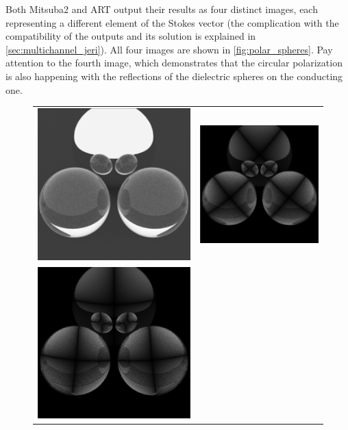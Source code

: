 Both Mitsuba2 and ART output their results as four distinct images, each representing a different element of the Stokes vector (the complication with the compatibility of the outputs and its solution is explained in \autoref{sec:multichannel_jeri}). All four images are shown in \autoref{fig:polar_spheres}. Pay attention to the fourth image, which demonstrates that the circular polarization is also happening with the reflections of the dielectric spheres on the conducting one.

\begin{figure}[h]
	\begin{tabular}{cc}
		\includegraphics[width=.45\linewidth]{img/polarizing_spheres.s0.png}
		&
		\includegraphics[width=.45\linewidth]{img/polarizing_spheres.s1.png} \\
		\includegraphics[width=.45\linewidth]{img/polarizing_spheres.s2.png}

\end{tabular}
\end{figure}

